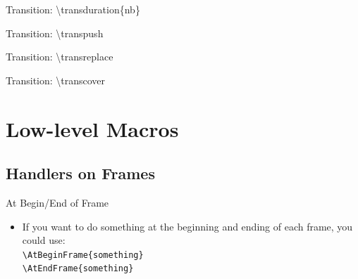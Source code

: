 \documentclass[english,sectioncirclenumberstyle]{ciadbeamer}
\begin{document}
\begin{frame}[c]{Transition: {\textbackslash}transduration\{nb\}}
	\begin{center}
	\end{center}
\end{frame}

\begin{frame}[c]{Transition: {\textbackslash}transpush}
	\transpush
	\begin{center}
	\end{center}
\end{frame}

\begin{frame}[c]{Transition: {\textbackslash}transreplace}
	\transreplace
	\begin{center}
	\end{center}
\end{frame}

\begin{frame}[c]{Transition: {\textbackslash}transcover}
	\transcover
	\begin{center}
	\end{center}
\end{frame}



\section{Low-level Macros}
\sectiontableofcontentslide

\subsection{Handlers on Frames}

\begin{frame}{At Begin/End of Frame}
	\begin{itemize}
	\item If you want to do something at the beginning and ending of each frame, you could use: \\
		\texttt{{\textbackslash}AtBeginFrame\{something\}} \\
		\texttt{{\textbackslash}AtEndFrame\{something\}}
	\end{itemize}
\end{frame}
\end{document}
